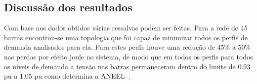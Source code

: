 \subsection{Discussão dos resultados}

Com base nos dados obtidos várias ressalvas podem ser feitas. Para a rede de 45 barras encontrou-se uma topologia que foi capaz de minimizar todos os perfis de demanda analisados para ela.
Para estes perfis houve uma redução de 45\% a 50\% nas perdas por efeito joule no sistema, de modo que em todos os perfis para todos os níveis de demanda a tensão nas barras permaneceram dentro do limite de 0.93 pu a 1.05 pu como determina a ANEEL~\cite{AgenciaNacionaldeEnergiaEletrica2018ModuloVigencia}.
